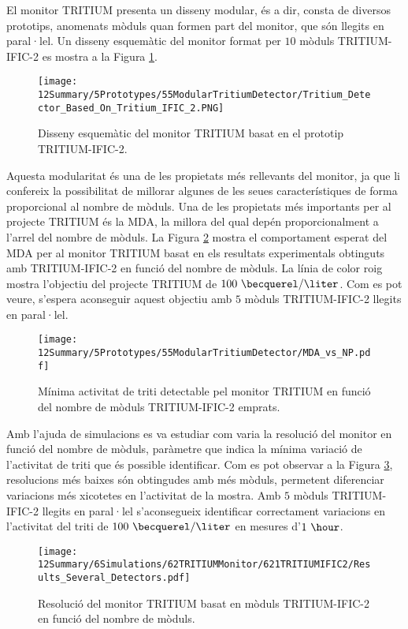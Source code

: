 El monitor TRITIUM presenta un disseny modular, és a dir, consta de diversos prototips, anomenats mòduls quan formen part del monitor, que són llegits en paral·lel. Un disseny esquemàtic del monitor format per $10$ mòduls TRITIUM-IFIC-2 es mostra a la Figura \ref{fig:10TritiumMonitorIFIC2}.
\begin{figure}[h]
\centering
\texttt{[image: 12Summary/5Prototypes/55ModularTritiumDetector/Tritium\_Detector\_Based\_On\_Tritium\_IFIC\_2.PNG]}
\caption{Disseny esquemàtic del monitor TRITIUM basat en el prototip TRITIUM-IFIC-2.\label{fig:10TritiumMonitorIFIC2}}
\end{figure}
Aquesta modularitat és una de les propietats més rellevants del monitor, ja que li confereix la possibilitat de millorar algunes de les seues característiques de forma proporcional al nombre de mòduls. Una de les propietats més importants per al projecte TRITIUM és la MDA, la millora del qual depén proporcionalment a l'arrel del nombre de mòduls. La Figura \ref{fig:MDATritiumMonitorIFIC2} mostra el comportament esperat del MDA per al monitor TRITIUM basat en els resultats experimentals obtinguts amb TRITIUM-IFIC-2 en funció del nombre de mòduls. La línia de color roig mostra l'objectiu del projecte TRITIUM de $100~\becquerel/\liter$. Com es pot veure, s'espera aconseguir aquest objectiu amb $5$ mòduls TRITIUM-IFIC-2 llegits en paral·lel.

\begin{figure}[h]
\centering
\texttt{[image: 12Summary/5Prototypes/55ModularTritiumDetector/MDA\_vs\_NP.pdf]}
\caption{Mínima activitat de triti detectable pel monitor TRITIUM en funció del nombre de mòduls TRITIUM-IFIC-2 emprats.\label{fig:MDATritiumMonitorIFIC2}}
\end{figure}

Amb l'ajuda de simulacions es va estudiar com varia la resolució del monitor en funció del nombre de mòduls, paràmetre que indica la mínima variació de l'activitat de triti que és possible identificar. Com es pot observar a la Figura \ref{fig:ResolucioTritiumMonitorIFIC2}, resolucions més baixes són obtingudes amb més mòduls, permetent diferenciar variacions més xicotetes en l'activitat de la mostra. Amb $5$ mòduls TRITIUM-IFIC-2 llegits en paral·lel s'aconsegueix identificar correctament variacions en l'activitat del triti de $100~\becquerel/\liter$ en mesures d'$1~\hour$.

\begin{figure}[h]
\centering
\texttt{[image: 12Summary/6Simulations/62TRITIUMMonitor/621TRITIUMIFIC2/Results\_Several\_Detectors.pdf]}
\caption{Resolució del monitor TRITIUM basat en mòduls TRITIUM-IFIC-2 en funció del nombre de mòduls.\label{fig:ResolucioTritiumMonitorIFIC2}}
\end{figure}